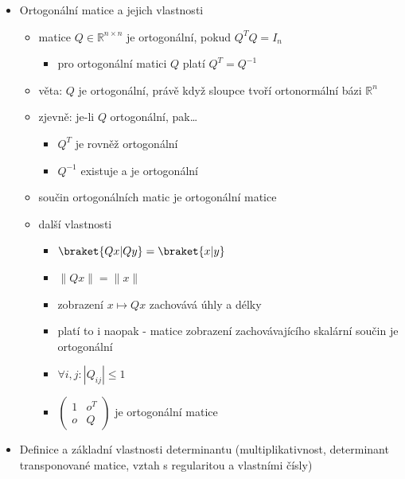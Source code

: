 \begin{itemize}
\begin{itemize}
\begin{itemize}
\item nechť $W$ je prostor se skalárním součinem a $V$ je jeho podprostor s ortonormální bází $Z=(v_1,\dots,v_n)$
\item zobrazení $p_Z:W\to V$ definované $p_Z(u)=\sum^n_{i=1}\langle u|v_i \rangle v_i$ je ortogonální (kolmá) projekce $W$ na $V$
\end{itemize}
\item pozorování: ortogonální projekce je lineární zobrazení
\end{itemize}
\item Ortogonální matice a jejich vlastnosti
\begin{itemize}
\item matice $Q\in\mathbb R^{n\times n}$ je ortogonální, pokud $Q^TQ=I_n$
\begin{itemize}
\item pro ortogonální matici $Q$ platí $Q^T=Q^{-1}$
\end{itemize}
\item věta: $Q$ je ortogonální, právě když sloupce tvoří ortonormální bázi $\mathbb R^n$
\item zjevně: je-li $Q$ ortogonální, pak\dots{}
\begin{itemize}
\item $Q^T$ je rovněž ortogonální
\item $Q^{-1}$ existuje a je ortogonální
\end{itemize}
\item součin ortogonálních matic je ortogonální matice
\item další vlastnosti
\begin{itemize}
\item $\braket{Qx|Qy}=\braket{x|y}$
\item $\|Qx\|=\|x\|$
\item zobrazení $x\mapsto Qx$ zachovává úhly a délky
\item platí to i naopak - matice zobrazení zachovávajícího skalární součin je ortogonální
\item $\forall i,j:|Q_{ij}|\leq 1$
\item $\begin{pmatrix}1 & o^T \\ o & Q\end{pmatrix}$ je ortogonální matice
\end{itemize}
\end{itemize}
\item Definice a základní vlastnosti determinantu (multiplikativnost, determinant transponované matice, vztah s regularitou a vlastními čísly)

\end{itemize}
